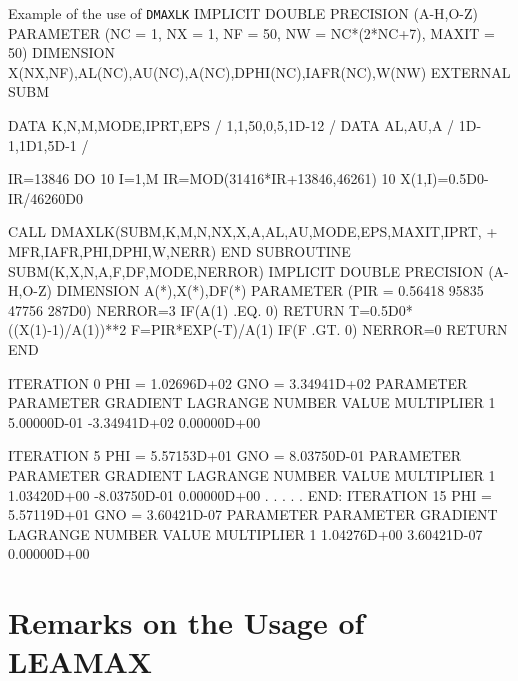 \begin{XMPt}{Example of the use of {\tt DMAXLK}}
      IMPLICIT DOUBLE PRECISION (A-H,O-Z)
      PARAMETER (NC = 1, NX = 1, NF = 50, NW = NC*(2*NC+7), MAXIT = 50)
      DIMENSION X(NX,NF),AL(NC),AU(NC),A(NC),DPHI(NC),IAFR(NC),W(NW)
      EXTERNAL SUBM
 
      DATA K,N,M,MODE,IPRT,EPS / 1,1,50,0,5,1D-12 /
      DATA AL,AU,A / 1D-1,1D1,5D-1 /
 
      IR=13846
      DO 10 I=1,M
      IR=MOD(31416*IR+13846,46261)
   10 X(1,I)=0.5D0-IR/46260D0
 
      CALL DMAXLK(SUBM,K,M,N,NX,X,A,AL,AU,MODE,EPS,MAXIT,IPRT,
     +            MFR,IAFR,PHI,DPHI,W,NERR)
      END
      SUBROUTINE SUBM(K,X,N,A,F,DF,MODE,NERROR)
      IMPLICIT DOUBLE PRECISION (A-H,O-Z)
      DIMENSION A(*),X(*),DF(*)
      PARAMETER (PIR = 0.56418 95835 47756 287D0)
      NERROR=3
      IF(A(1) .EQ. 0) RETURN
      T=0.5D0*((X(1)-1)/A(1))**2
      F=PIR*EXP(-T)/A(1)
      IF(F .GT. 0) NERROR=0
      RETURN
      END
\end{XMPt}

\begin{Listing}
       ITERATION   0   PHI =  1.02696D+02      GNO =  3.34941D+02
       PARAMETER       PARAMETER         GRADIENT          LAGRANGE
         NUMBER          VALUE                            MULTIPLIER
            1          5.00000D-01     -3.34941D+02      0.00000D+00
 
       ITERATION   5   PHI =  5.57153D+01      GNO =  8.03750D-01
       PARAMETER       PARAMETER         GRADIENT          LAGRANGE
         NUMBER          VALUE                            MULTIPLIER
            1          1.03420D+00     -8.03750D-01      0.00000D+00
. . . . .
  END: ITERATION  15   PHI =  5.57119D+01      GNO =  3.60421D-07
       PARAMETER       PARAMETER         GRADIENT          LAGRANGE
         NUMBER          VALUE                            MULTIPLIER
            1          1.04276D+00      3.60421D-07      0.00000D+00
\end{Listing}

\chapter{Remarks on the Usage of LEAMAX}

